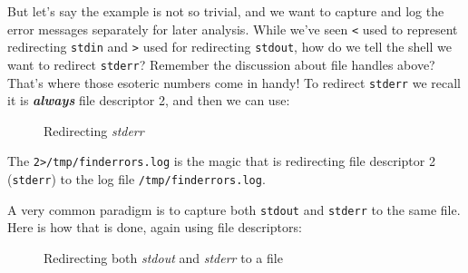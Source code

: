 \documentclass[10pt,american,]{book}
\newenvironment{Shaded}{\begin{snugshade}}{\end{snugshade}}
\newcommand{\KeywordTok}[1]{\textcolor[rgb]{0.13,0.29,0.53}{\textbf{{#1}}}}
\newcommand{\DataTypeTok}[1]{\textcolor[rgb]{0.13,0.29,0.53}{{#1}}}
\newcommand{\NormalTok}[1]{{#1}}
\numberwithin{figure}{chapter}
\DeclareRobustCommand{\drcap}[1]{\begin{figure}[H]\caption{#1}\end{figure}}
\renewcommand{\KeywordTok}[1]{{#1}}
\renewcommand{\DataTypeTok}[1]{{#1}}
\renewcommand{\NormalTok}[1]{{#1}}
\begin{document}
But let's say the example is not so trivial, and we want to capture and
log the error messages separately for later analysis. While we've seen
\texttt{\textless{}} used to represent redirecting \texttt{stdin} and
\texttt{\textgreater{}} used for redirecting \texttt{stdout}, how do we
tell the shell we want to redirect \texttt{stderr}? Remember the
discussion about file handles above? That's where those esoteric numbers
come in handy! To redirect
\texttt{stderr} we recall it is
\textbf{\emph{always}} file descriptor 2, and then we can use:

\drcap{Redirecting \textit{stderr}}

\begin{Shaded}
\end{Shaded}

The
\texttt{2\textgreater{}/tmp/finderrors.log}
 is the magic that is
redirecting file descriptor 2 (\texttt{stderr}) to the log file
\texttt{/tmp/finderrors.log}.

A very common paradigm is to capture both
\texttt{stdout} and
\texttt{stderr} to the same file. Here is how that is done, again using
file descriptors:

\drcap{Redirecting both \textit{stdout} and \textit{stderr} to a file}

\begin{Shaded}
\end{Shaded}
\end{document}
